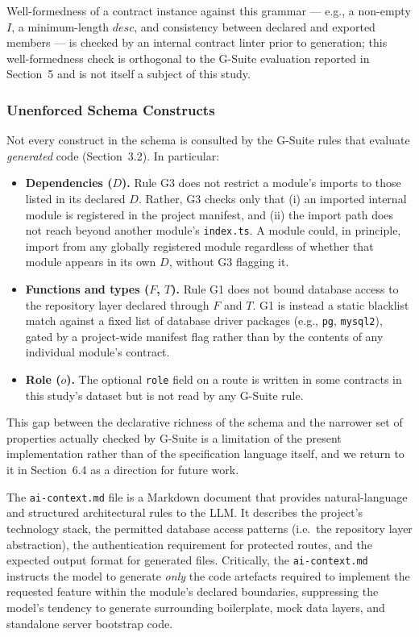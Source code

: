 \documentclass[review,12pt,3p]{elsarticle}
\begin{document}
Well-formedness of a contract instance against this grammar --- e.g.,
a non-empty $I$, a minimum-length $\mathit{desc}$, and consistency
between declared and exported members --- is checked by an internal
contract linter prior to generation; this well-formedness check is
orthogonal to the G-Suite evaluation reported in Section~5 and is not
itself a subject of this study.

\subsubsection{Unenforced Schema Constructs}

Not every construct in the schema is consulted by the G-Suite rules
that evaluate \emph{generated} code (Section~3.2). In particular:

\begin{itemize}
  \item \textbf{Dependencies ($D$).} Rule G3 does not restrict a
    module's imports to those listed in its declared $D$. Rather, G3
    checks only that (i) an imported internal module is registered in
    the project manifest, and (ii) the import path does not reach
    beyond another module's \texttt{index.ts}. A module could, in
    principle, import from any globally registered module regardless
    of whether that module appears in its own $D$, without G3
    flagging it.
  \item \textbf{Functions and types ($F$, $T$).} Rule G1 does not
    bound database access to the repository layer declared through
    $F$ and $T$. G1 is instead a static blacklist match against a
    fixed list of database driver packages (e.g., \texttt{pg},
    \texttt{mysql2}), gated by a project-wide manifest flag rather
    than by the contents of any individual module's contract.
  \item \textbf{Role ($o$).} The optional \texttt{role} field on a
    route is written in some contracts in this study's dataset but is
    not read by any G-Suite rule.
\end{itemize}

This gap between the declarative richness of the schema and the
narrower set of properties actually checked by G-Suite is a limitation
of the present implementation rather than of the specification
language itself, and we return to it in Section~6.4 as a direction
for future work.

The \texttt{ai-context.md} file is a Markdown document that provides natural-language and
structured architectural rules to the LLM. It describes the project's technology stack,
the permitted database access patterns (i.e.\ the repository layer abstraction), the
authentication requirement for protected routes, and the expected output format for
generated files. Critically, the \texttt{ai-context.md} instructs the model to generate
\emph{only} the code artefacts required to implement the requested feature within the
module's declared boundaries, suppressing the model's tendency to generate surrounding
boilerplate, mock data layers, and standalone server bootstrap code.
\end{document}
